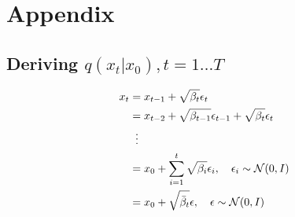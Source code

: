 \section{Appendix}
\subsection{Deriving $q(x_t|x_0), t=1\hdots T$}
 \begin{align}
     x_t &= x_{t-1} + \sqrt{\beta_t}\epsilon_t\\
     &= x_{t-2} + \sqrt{\beta_{t-1}}\epsilon_{t-1} +  \sqrt{\beta_t}\epsilon_t\\
     &\hspace{5.5pt}\vdots\\
     &=x_0 +  \sum_{i=1}^t \sqrt{\beta_{i}}\epsilon_i,\quad \epsilon_i\sim\mathcal N(0,I)\\
     &=x_0+\sqrt{\bar\beta_t}\epsilon,\quad 
     \epsilon\sim\mathcal N(0,I)
 \end{align}
